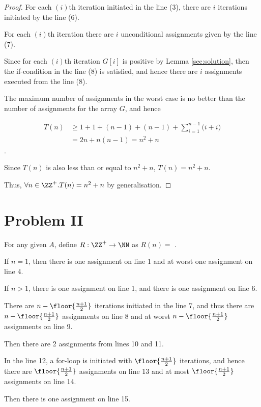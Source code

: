 \documentclass[11pt]{scrartcl}
\begin{document}
\begin{proof}
  For each $(i)$th iteration initiated in the line (3), there are $i$
  iterations initiated by the line (6).

  For each $(i)$th iteration there are $i$ unconditional assignments
  given by the line (7).

  Since for each $(i)$th iteration $G[i]$ is positive by Lemma
  \ref{sec:solution}, then the if-condition in the line (8) is
  satisfied, and hence there are $i$ assignments executed from the
  line (8).

  The maximum number of assignments in the worst case is no better
  than the number of assignments for the array $G$, and hence

  \begin{align}
  T(n) &\geq 1 + 1 + (n-1)+(n-1)+ \sum_{i=1}^{n-1}\big(i+i\big)\\
       &=2n +n(n-1) = n^2+n
\end{align}.

Since $T(n)$ is also less than or equal to $n^2+n$, $T(n) = n^2 + n$.

Thus, $\forall n\in\ZZ^+.T(n) = n^2+n$ by generalisation.
\end{proof}

\section*{Problem II}

For any given $A$, define $R:\ZZ^+\to \NN$ as $R(n) =$ .

If $n=1$, then there is one assignment on line 1 and at worst one assignment on line 4.

If $n > 1$, there is one assignment on line 1, and there is one assignment on line 6.

There are $n-\floor{\frac{n+1}{2}}$ iterations initiated in the line 7, and thus there are $n-\floor{\frac{n+1}{2}}$ assignments on line 8 and at worst $n-\floor{\frac{n+1}{2}}$ assignments on line 9.

Then there are 2 assignments from lines 10 and 11.

In the line 12, a for-loop is initiated with $\floor{\frac{n+1}{2}}$ iterations, and hence there are $\floor{\frac{n+1}{2}}$ assignments on line 13 and at most $\floor{\frac{n+1}{2}}$ assignments on line 14.

Then there is one assignment on line 15.
\end{document}
